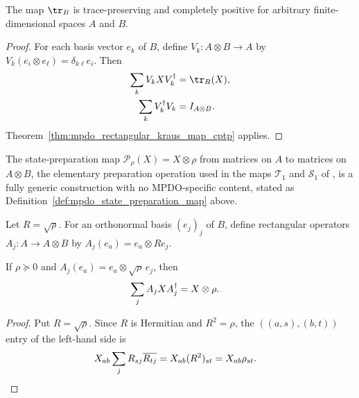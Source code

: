 \begin{lemma}
    \label{lem:mpdo_right_partial_trace_cptp}
    \leanok
    The map $\tr_B$ is trace-preserving and completely positive for arbitrary
    finite-dimensional spaces $A$ and $B$.
\end{lemma}

\begin{proof}
    \leanok
    For each basis vector $e_k$ of $B$, define
    $V_k:A\otimes B\to A$ by
    $V_k(e_i\otimes e_\ell)=\delta_{k\ell}e_i$. Then
    \begin{align}
        \sum_k V_kXV_k^\dagger&=\tr_B(X),
        \notag\\
        \sum_k V_k^\dagger V_k&=I_{A\otimes B}.
        \notag
    \end{align}
    Theorem~\ref{thm:mpdo_rectangular_kraus_map_cptp} applies.
\end{proof}

The state-preparation map $\mathcal P_\rho(X)=X\otimes\rho$ from matrices on
$A$ to matrices on $A\otimes B$, the elementary preparation operation used
in the maps $\mathcal T_1$ and $\mathcal S_1$ of
\cite[Appendix~C.2, lines~1527--1533 and~1551--1555]{Cirac2016MPDO_arXiv},
is a fully generic construction with no MPDO-specific content, stated as
Definition~\ref{def:mpdo_state_preparation_map} above.

\begin{definition}
    \label{def:mpdo_state_preparation_kraus}
    \leanok
    Let $R=\sqrt\rho$. For an orthonormal basis $(e_j)_j$ of $B$, define
    rectangular operators $A_j:A\to A\otimes B$ by
    $A_j(e_a)=e_a\otimes Re_j$.
\end{definition}

\begin{theorem}
    \label{thm:mpdo_state_preparation_kraus_action}
    \leanok
    If $\rho\succeq0$ and $A_j(e_a)=e_a\otimes\sqrt\rho\,e_j$, then
    \begin{align}
        \sum_j A_jXA_j^\dagger&=X\otimes\rho.
        \notag
    \end{align}
\end{theorem}
\begin{proof}
    \leanok
    Put $R=\sqrt\rho$. Since $R$ is Hermitian and $R^2=\rho$, the
    $((a,s),(b,t))$ entry of the left-hand side is
    \begin{align}
        X_{ab}\sum_jR_{sj}\overline{R_{tj}}
        &=X_{ab}(R^2)_{st}=X_{ab}\rho_{st}.
        \notag
    \end{align}
\end{proof}


